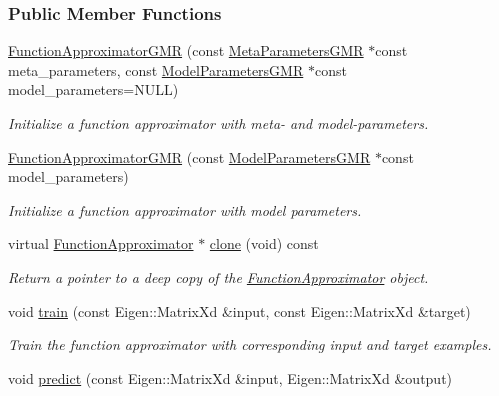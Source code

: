 \subsubsection*{Public Member Functions}
\begin{DoxyCompactItemize}
\item 
\hyperlink{classDmpBbo_1_1FunctionApproximatorGMR_a9434853efd2326bd0cb7412c13fe55d3}{Function\+Approximator\+G\+M\+R} (const \hyperlink{classDmpBbo_1_1MetaParametersGMR}{Meta\+Parameters\+G\+M\+R} $\ast$const meta\+\_\+parameters, const \hyperlink{classDmpBbo_1_1ModelParametersGMR}{Model\+Parameters\+G\+M\+R} $\ast$const model\+\_\+parameters=N\+U\+L\+L)
\begin{DoxyCompactList}\small\item\em Initialize a function approximator with meta-\/ and model-\/parameters. \end{DoxyCompactList}\item 
\hyperlink{classDmpBbo_1_1FunctionApproximatorGMR_a7f7f6196ae263db36362c5aa2a8c6069}{Function\+Approximator\+G\+M\+R} (const \hyperlink{classDmpBbo_1_1ModelParametersGMR}{Model\+Parameters\+G\+M\+R} $\ast$const model\+\_\+parameters)
\begin{DoxyCompactList}\small\item\em Initialize a function approximator with model parameters. \end{DoxyCompactList}\item 
virtual \hyperlink{classDmpBbo_1_1FunctionApproximator}{Function\+Approximator} $\ast$ \hyperlink{classDmpBbo_1_1FunctionApproximatorGMR_ad792a46ac006916c5c1ffed2fa42dd24}{clone} (void) const 
\begin{DoxyCompactList}\small\item\em Return a pointer to a deep copy of the \hyperlink{classDmpBbo_1_1FunctionApproximator}{Function\+Approximator} object. \end{DoxyCompactList}\item 
void \hyperlink{classDmpBbo_1_1FunctionApproximatorGMR_ac453415cf4894aba45e8db6ebc4cd4dc}{train} (const Eigen\+::\+Matrix\+Xd \&input, const Eigen\+::\+Matrix\+Xd \&target)
\begin{DoxyCompactList}\small\item\em Train the function approximator with corresponding input and target examples. \end{DoxyCompactList}\item 
void \hyperlink{classDmpBbo_1_1FunctionApproximatorGMR_afe8dcfb9cd065dfde38dce1f6e6cd3e6}{predict} (const Eigen\+::\+Matrix\+Xd \&input, Eigen\+::\+Matrix\+Xd \&output)

\end{DoxyCompactItemize}
